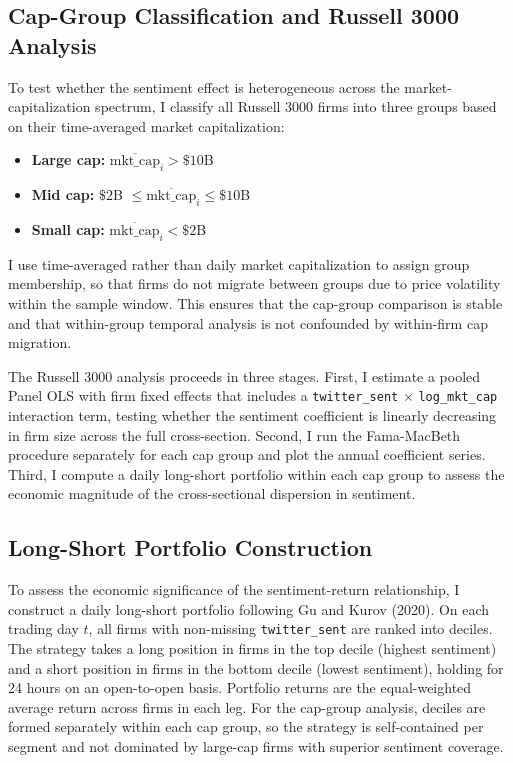 \subsection{Cap-Group Classification and Russell 3000
Analysis}\label{cap-group-classification-and-russell-3000-analysis}

To test whether the sentiment effect is heterogeneous across the
market-capitalization spectrum, I classify all Russell 3000 firms into
three groups based on their time-averaged market capitalization:

\begin{itemize}
\item
  \textbf{Large cap:} \({\overline{\text{mkt\_cap}}}_{i} > \$ 10\)B
\item
  \textbf{Mid cap:} \(\$ 2\)B
  \(\leq {\overline{\text{mkt\_cap}}}_{i} \leq \$ 10\)B
\item
  \textbf{Small cap:} \({\overline{\text{mkt\_cap}}}_{i} < \$ 2\)B
\end{itemize}

I use time-averaged rather than daily market capitalization to assign
group membership, so that firms do not migrate between groups due to
price volatility within the sample window. This ensures that the
cap-group comparison is stable and that within-group temporal analysis
is not confounded by within-firm cap migration.

The Russell 3000 analysis proceeds in three stages. First, I estimate a
pooled Panel OLS with firm fixed effects that includes a
\texttt{twitter\_sent} \(\times\) \texttt{log\_mkt\_cap} interaction
term, testing whether the sentiment coefficient is linearly decreasing
in firm size across the full cross-section. Second, I run the
Fama-MacBeth procedure separately for each cap group and plot the annual
coefficient series. Third, I compute a daily long-short portfolio within
each cap group to assess the economic magnitude of the cross-sectional
dispersion in sentiment.

\subsection{Long-Short Portfolio
Construction}\label{long-short-portfolio-construction}

To assess the economic significance of the sentiment-return
relationship, I construct a daily long-short portfolio following Gu and
Kurov (2020). %
On each trading day \(t\), all firms with non-missing
\texttt{twitter\_sent} are ranked into deciles. The strategy takes a
long position in firms in the top decile (highest sentiment) and a short
position in firms in the bottom decile (lowest sentiment), holding for
24 hours on an open-to-open basis. Portfolio returns are the
equal-weighted average return across firms in each leg. For the
cap-group analysis, deciles are formed separately within each cap group,
so the strategy is self-contained per segment and not dominated by
large-cap firms with superior sentiment coverage.

